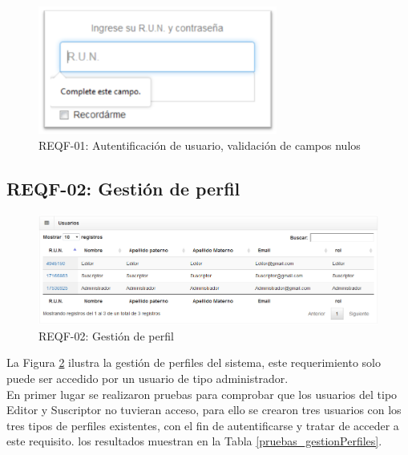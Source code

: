 	\begin{figure}[H]
		\centering
		\includegraphics[width=0.7\textwidth]{images/Capitulo_5/REQF-01-null.png}
		\caption[REQF-01: Autentificación de usuario, validación de campos nulos]{REQF-01: Autentificación de usuario, validación de campos nulos}
		\label{REQF-01-null}
	\end{figure}
	
\subsection{REQF-02: Gestión de perfil}

\begin{figure}[H]
	\centering
	\includegraphics[width=1\textwidth]{images/Capitulo_5/REQF-02.png}
	\caption[REQF-02: Gestión de perfil]{REQF-02: Gestión de perfil}
	\label{REQF-02}
\end{figure}

La Figura \ref{REQF-02} ilustra la gestión de perfiles del sistema,  este requerimiento solo puede ser accedido por un usuario de tipo administrador.
\\
En primer lugar se realizaron pruebas para comprobar que los usuarios del tipo Editor y Suscriptor  no tuvieran acceso, para ello se crearon  tres usuarios con los tres tipos de perfiles existentes, con el fin de autentificarse y tratar de acceder a este requisito. los resultados muestran en la Tabla \ref{pruebas_gestionPerfiles}.

